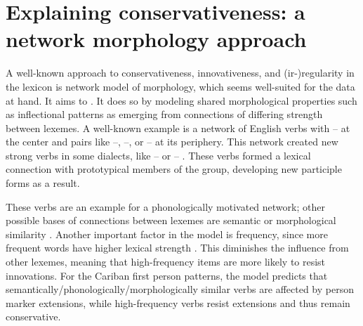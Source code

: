 \section{Explaining conservativeness: a network morphology approach}
\label{sec:motivations}
A well-known approach to conservativeness, innovativeness, and (ir-){}re\-gu\-la\-ri\-ty in the lexicon is  network model of morphology, which seems well-suited for the data at hand.
It aims to  \parencite[428]{bybee1995regular}.
It does so by modeling shared morphological properties such as inflectional patterns as emerging from connections of differing strength between lexemes.
A well-known example is a network of  English verbs with -- at the center and pairs like --, --, or -- at its periphery.
This network created new strong verbs in some dialects, like -- or -- \parencite[129--130]{bybee1985morphology}.
These verbs formed a lexical connection with prototypical members of the group, developing new participle forms as a result.

These verbs are an example for a phonologically motivated network; other possible bases of connections between lexemes are semantic or morphological similarity \parencite[118]{bybee1985morphology}.
Another important factor in the model is frequency, since more frequent words have higher lexical strength \parencite[119]{bybee1985morphology}.
This diminishes the influence from other lexemes, meaning that high-frequency items are more likely to resist innovations.
For the Cariban first person patterns, the model predicts that semantically\slash{}phonologically\slash\hspace{0pt}morphologically similar verbs are affected by person marker extensions, while high-frequency verbs resist extensions and thus remain conservative.

